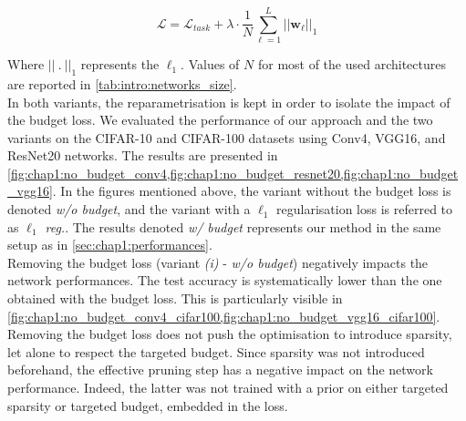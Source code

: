 \begin{equation}
  \label{eqn:chap1:globalloss_l1}
  \mathcal{L} = \mathcal{L}_{task} + \lambda \cdot \frac{1}{N} \sum_{\ell=1}^{L} || \mathbf{w}_\ell ||_1
\end{equation}

Where $||~.~||_1$ represents the $\ell_1$. Values of $N$ for most of the used
architectures are reported in \cref{tab:intro:networks_size}.\\

In both variants, the reparametrisation is kept in order to isolate the impact
of the budget loss. We evaluated the performance of our approach and the two
variants on the CIFAR-10 and CIFAR-100 datasets using Conv4, VGG16, and ResNet20
networks. The results are presented in
\cref{fig:chap1:no_budget_conv4,fig:chap1:no_budget_resnet20,fig:chap1:no_budget_vgg16}.
In the figures mentioned above, the variant without the budget loss is denoted
\emph{w/o budget}, and the variant with a $\ell_1$ regularisation loss is
referred to as \emph{$\ell_1$ reg.}. The results denoted \emph{w/ budget}
represents our method in the same setup as in \cref{sec:chap1:performances}.\\

Removing the budget loss (variant \emph{(i)} - \emph{w/o budget}) negatively
impacts the network performances. The test accuracy is systematically lower than
the one obtained with the budget loss. This is particularly visible in
\cref{fig:chap1:no_budget_conv4_cifar100,fig:chap1:no_budget_vgg16_cifar100}.
Removing the budget loss does not push the optimisation to introduce sparsity,
let alone to respect the targeted budget. Since sparsity was not introduced
beforehand, the effective pruning step has a negative impact on the network
performance. Indeed, the latter was not trained with a prior on either targeted
sparsity or targeted budget, embedded in the loss.\\


